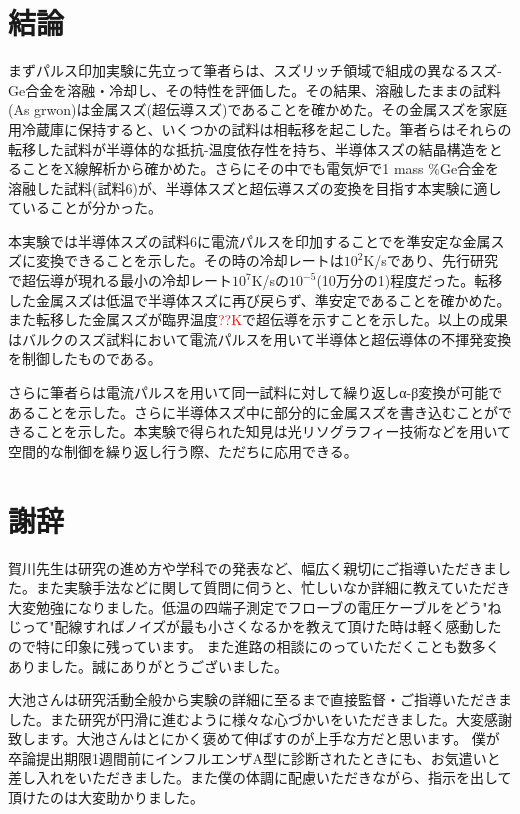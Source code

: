 \section{結論}
まずパルス印加実験に先立って筆者らは、スズリッチ領域で組成の異なるスズ-Ge合金を溶融・冷却し、その特性を評価した。その結果、溶融したままの試料(As grwon)は金属スズ(超伝導スズ)であることを確かめた。その金属スズを家庭用冷蔵庫に保持すると、いくつかの試料は相転移を起こした。筆者らはそれらの転移した試料が半導体的な抵抗-温度依存性を持ち、半導体スズの結晶構造をとることをX線解析から確かめた。さらにその中でも電気炉で1 mass \%Ge合金を溶融した試料(試料6)が、半導体スズと超伝導スズの変換を目指す本実験に適していることが分かった。

本実験では半導体スズの試料6に電流パルスを印加することでを準安定な金属スズに変換できることを示した。その時の冷却レートは$10^2$K/sであり、先行研究\cite{oike}で超伝導が現れる最小の冷却レート$10^7$K/sの$10^{-5}$(10万分の1)程度だった。転移した金属スズは低温で半導体スズに再び戻らず、準安定であることを確かめた。また転移した金属スズが臨界温度\textcolor{red}{??K}で超伝導を示すことを示した。以上の成果はバルクのスズ試料において電流パルスを用いて半導体と超伝導体の不揮発変換を制御したものである。

さらに筆者らは電流パルスを用いて同一試料に対して繰り返しα-β変換が可能であることを示した。さらに半導体スズ中に部分的に金属スズを書き込むことができることを示した。本実験で得られた知見は光リソグラフィー技術などを用いて空間的な制御を繰り返し行う際、ただちに応用できる。
\clearpage

\section*{謝辞}
賀川先生は研究の進め方や学科での発表など、幅広く親切にご指導いただきました。また実験手法などに関して質問に伺うと、忙しいなか詳細に教えていただき大変勉強になりました。低温の四端子測定でフローブの電圧ケーブルをどう"ねじって"配線すればノイズが最も小さくなるかを教えて頂けた時は軽く感動したので特に印象に残っています。
また進路の相談にのっていただくことも数多くありました。誠にありがとうございました。

大池さんは研究活動全般から実験の詳細に至るまで直接監督・ご指導いただきました。また研究が円滑に進むように様々な心づかいをいただきました。大変感謝致します。大池さんはとにかく褒めて伸ばすのが上手な方だと思います。
僕が卒論提出期限1週間前にインフルエンザA型に診断されたときにも、お気遣いと差し入れをいただきました。また僕の体調に配慮いただきながら、指示を出して頂けたのは大変助かりました。

